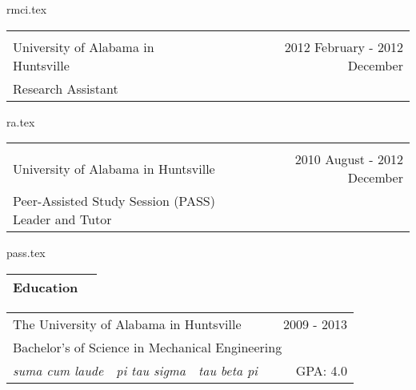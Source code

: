 \documentclass[10pt,a4paper]{article}
\begin{document}
\bigskip

{rmci.tex}

\noindent\begin{tabularx}{\textwidth}{Xr}
  \Large                                                              \\ \bottomrule \\
  University of Alabama in Huntsville & 2012 February - 2012 December \\
  Research Assistant                  &                               \\
\end{tabularx}

{ra.tex}

\noindent\begin{tabularx}{\textwidth}{Xr}
  \Large                                                                            \\ \bottomrule \\
  University of Alabama in Huntsville                 & 2010 August - 2012 December \\
  Peer-Assisted Study Session (PASS) Leader and Tutor &                             \\
\end{tabularx}

{pass.tex}

\noindent\begin{tabularx}{\textwidth}{Xr}
  \Large Education & \\
  \bottomrule
\end{tabularx}
\smallskip

\noindent\begin{tabularx}{\textwidth}{cccXr}
  \multicolumn{3}{l}{The University of Alabama in Huntsville} &                       & 2009 - 2013                        \\
  \multicolumn{5}{l}{\hspace{.125in} Bachelor's of Science in Mechanical Engineering}                                      \\
  \hspace{.125in} \textit{suma cum laude}                     & \textit{pi tau sigma} & \textit{tau beta pi} &  & GPA: 4.0 \\
\end{tabularx}
\bigskip
\end{document}
